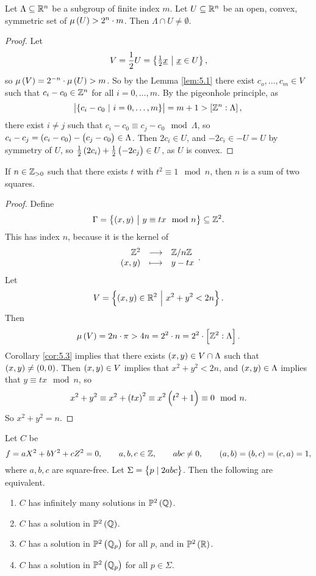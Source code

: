 \begin{corollary}
\label{cor:5.3}
Let $ \Lambda \subseteq \mathbb{R}^n $ be a subgroup of finite index $ m $. Let $ U \subseteq \mathbb{R}^n $ be an open, convex, symmetric set of $ \mu\br{U} > 2^n \cdot m $. Then $ \Lambda \cap U \ne \emptyset $.
\end{corollary}

\begin{proof}
Let
$$ V = \dfrac{1}{2}U = \cbr{\tfrac{1}{2}\underline{x} \st \underline{x} \in U}, $$
so $ \mu\br{V} = 2^{-n} \cdot \mu\br{U} > m $. So by the Lemma \ref{lem:5.1} there exist $ c_o, \dots, c_m \in V $ such that $ c_i - c_0 \in \mathbb{Z}^n $ for all $ i = 0, \dots, m $. By the pigeonhole principle, as
$$ \abs{\cbr{c_i - c_0 \st i = 0, \dots, m}} = m + 1 > \sbr{\ZZ^n : \Lambda}, $$
there exist $ i \ne j $ such that $ c_i - c_0 \equiv c_j - c_0 \mod \Lambda $, so $ c_i - c_j = \br{c_i - c_0} - \br{c_j - c_0} \in \Lambda $. Then $ 2c_i \in U $, and $ -2c_i \in -U = U $ by symmetry of $ U $, so $ \tfrac{1}{2}\br{2c_i} + \tfrac{1}{2}\br{-2c_j} \in U $, as $ U $ is convex.
\end{proof}

\begin{theorem}
If $ n \in \mathbb{Z}_{> 0} $ such that there exists $ t $ with $ t^2 \equiv 1 \mod n $, then $ n $ is a sum of two squares.
\end{theorem}

\begin{proof}
Define
$$ \Gamma = \cbr{\br{x, y} \st y \equiv tx \mod n} \subseteq \ZZ^2. $$
This has index $ n $, because it is the kernel of
$$ \function{\ZZ^2}{\ZZ / n\ZZ}{\br{x, y}}{y - tx}. $$
Let
$$ V = \cbr{\br{x, y} \in \RR^2 \st x^2 + y^2 < 2n}. $$
Then
$$ \mu\br{V} = 2n \cdot \pi > 4n = 2^2 \cdot n = 2^2 \cdot \sbr{\ZZ^2 : \Lambda}. $$
Corollary \ref{cor:5.3} implies that there exists $ \br{x, y} \in V \cap \Lambda $ such that $ \br{x, y} \ne \br{0, 0} $. Then $ \br{x, y} \in V $ implies that $ x^2 + y^2 < 2n $, and $ \br{x, y} \in \Lambda $ implies that $ y \equiv tx \mod n $, so
$$ x^2 + y^2 \equiv x^2 + \br{tx}^2 \equiv x^2\br{t^2 + 1} \equiv 0 \mod n. $$
So $ x^2 + y^2 = n $.
\end{proof}


\begin{theorem}
Let $ C $ be
$$ f = aX^2 + bY^2 + cZ^2 = 0, \qquad a, b, c \in \ZZ, \qquad abc \ne 0, \qquad \br{a, b} = \br{b, c} = \br{c, a} = 1, $$
where $ a, b, c $ are square-free. Let $ \Sigma = \cbr{p \mid 2abc} $. Then the following are equivalent.
\begin{enumerate}
\item $ C $ has infinitely many solutions in $ \PP^2\br{\QQ} $.
\item $ C $ has a solution in $ \PP^2\br{\QQ} $.
\item $ C $ has a solution in $ \PP^2\br{\QQ_p} $ for all $ p $, and in $ \PP^2\br{\RR} $.
\item $ C $ has a solution in $ \PP^2\br{\QQ_p} $ for all $ p \in \Sigma $.
\end{enumerate}
\end{theorem}

